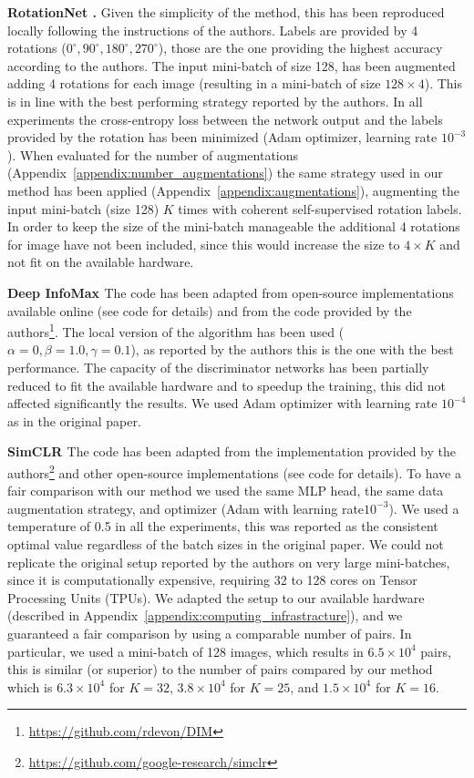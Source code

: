 \documentclass{article}
\begin{document}
\textbf{RotationNet \citep{gidaris2018unsupervised}.} Given the simplicity of the method, this has been reproduced locally following the instructions of the authors. Labels are provided by 4 rotations ($0^{\circ}, 90^{\circ}, 180^{\circ}, 270^{\circ}$), those are the one providing the highest accuracy according to the authors. The input mini-batch of size 128, has been augmented adding 4 rotations for each image (resulting in a mini-batch of size $128 \times 4$). This is in line with the best performing strategy reported by the authors. In all experiments the cross-entropy loss between the network output and the labels provided by the rotation has been minimized (Adam optimizer, learning rate $10^{-3}$). When evaluated for the number of augmentations (Appendix~\ref{appendix:number_augmentations}) the same strategy used in our method has been applied (Appendix~\ref{appendix:augmentations}), augmenting the input mini-batch (size 128) $K$ times with coherent self-supervised rotation labels. In order to keep the size of the mini-batch manageable the additional 4 rotations for image have not been included, since this would increase the size to $4 \times K$ and not fit on the available hardware.

\textbf{Deep InfoMax \citep{hjelm2018learning}} The code has been adapted from open-source implementations available online (see code for details) and from the code provided by the authors\footnote{\url{https://github.com/rdevon/DIM}}. The local version of the algorithm has been used ($\alpha=0, \beta=1.0, \gamma=0.1$), as reported by the authors this is the one with the best performance. The capacity of the discriminator networks has been partially reduced to fit the available hardware and to speedup the training, this did not affected significantly the results. We used Adam optimizer with learning rate $10^{-4}$ as in the original paper.

\textbf{SimCLR \citep{chen2020simple}} The code has been adapted from the implementation provided by the authors\footnote{\url{https://github.com/google-research/simclr}} and other open-source implementations (see code for details). To have a fair comparison with our method we used the same MLP head, the same data augmentation strategy, and optimizer (Adam with learning rate$10^{-3}$). We used a temperature of 0.5 in all the experiments, this was reported as the consistent optimal value regardless of the batch sizes in the original paper. We could not replicate the original setup reported by the authors on very large mini-batches, since it is computationally expensive, requiring 32 to 128 cores on Tensor Processing Units (TPUs). We adapted the setup to our available hardware (described in Appendix~\ref{appendix:computing_infrastracture}), and we guaranteed a fair comparison by using a comparable number of pairs. In particular, we used a mini-batch of 128 images, which results in $6.5 \times 10^{4}$ pairs, this is similar (or superior) to the number of pairs compared by our method which is $6.3 \times 10^{4}$ for $K=32$, $3.8\times10^{4}$ for $K=25$, and $1.5\times10^{4}$ for $K=16$.
\end{document}
